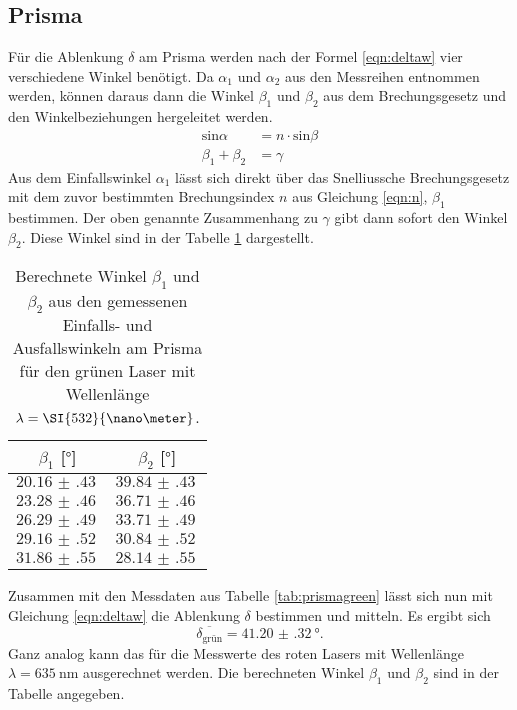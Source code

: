\subsection{Prisma}
Für die Ablenkung $\delta$ am Prisma werden nach der Formel \eqref{eqn:deltaw} vier verschiedene Winkel benötigt. 
Da $\alpha_1$ und $\alpha_2$  aus den Messreihen entnommen werden, können daraus dann die Winkel $\beta_1$ und $\beta_2$ aus dem Brechungsgesetz und den Winkelbeziehungen hergeleitet werden.
\begin{align*}
    \text{sin}\alpha &= n \cdot \text{sin}\beta \\
    \beta_1 + \beta_2 &= \gamma
\end{align*}
Aus dem Einfallswinkel $\alpha_1$ lässt sich direkt über das Snelliussche Brechungsgesetz mit dem zuvor bestimmten Brechungsindex $n$ aus Gleichung \eqref{eqn:n}, $\beta_1$ bestimmen.
Der oben genannte Zusammenhang zu $\gamma$ gibt dann sofort den Winkel $\beta_2$. Diese Winkel sind in der Tabelle \ref{tab:prismagreenber} dargestellt.

\begin{table}
    \centering
    \caption{Berechnete Winkel $\beta_1$ und $\beta_2$ aus den gemessenen Einfalls- und Ausfallswinkeln am Prisma für den grünen Laser mit Wellenlänge $\protect \lambda = \SI{532}{\nano\meter}$.}
    \label{tab:prismagreenber}
    \begin{tabular}{c c}
        \toprule
        $\beta_1$ [$\si{\degree}$] & $\beta_2$ [$\si{\degree}$] \\
        \midrule
        $\SI{20.16(43)}{}$ & $\SI{39.84(43)}{}$\\
        $\SI{23.28(46)}{}$ & $\SI{36.71(46)}{}$\\  
        $\SI{26.29(49)}{}$ & $\SI{33.71(49)}{}$\\
        $\SI{29.16(52)}{}$ & $\SI{30.84(52)}{}$\\
        $\SI{31.86(55)}{}$ & $\SI{28.14(55)}{}$\\
        \bottomrule    
    \end{tabular}
\end{table}

Zusammen mit den Messdaten aus Tabelle \ref{tab:prismagreen} lässt sich nun mit Gleichung \ref{eqn:deltaw} die Ablenkung $\delta$ bestimmen und mitteln. Es ergibt sich
\begin{equation}
    \overline{\delta_{\text{grün}}} = \SI{41.20(32)}{\degree}.
\end{equation}
Ganz analog kann das für die Messwerte des roten Lasers mit Wellenlänge $\lambda = \SI{635}{\nano\meter}$ ausgerechnet werden.
Die berechneten Winkel $\beta_1$ und $\beta_2$ sind in der Tabelle \label{tab:prismaredber} angegeben.

